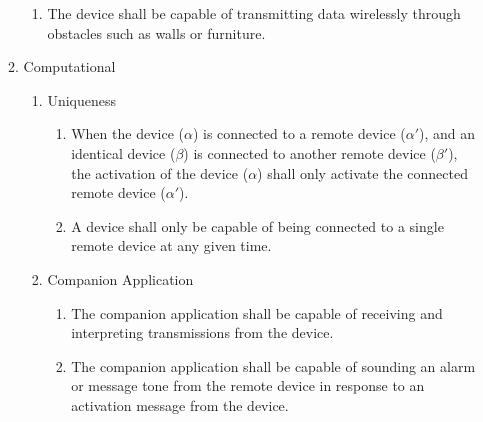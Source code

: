\documentclass[twoside]{article}
\begin{document}
\begin{enumerate}
\begin{enumerate}
\begin{enumerate}
    \item The device shall be capable of transmitting data wirelessly through obstacles such as walls or furniture.

    \end{enumerate}

  \item Computational

    \begin{enumerate}

    \item Uniqueness
      \begin{enumerate}

      \item When the device ($\alpha$) is connected to a remote device ($\alpha'$), and an identical device ($\beta$) is connected to another remote device ($\beta'$), the activation of the device ($\alpha$) shall only activate the connected remote device ($\alpha'$).

      \item A device shall only be capable of being connected to a single remote device at any given time.

      \end{enumerate}


    \item Companion Application
      \begin{enumerate}

      \item The companion application shall be capable of receiving and interpreting transmissions from the device.

      \item The companion application shall be capable of sounding an alarm or message tone from the remote device in response to an activation message from the device.

      \end{enumerate}

    \end{enumerate}

  \end{enumerate}

\end{enumerate}


\end{document}
